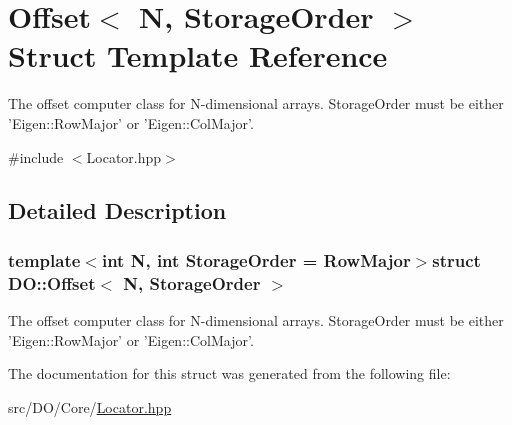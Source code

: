 \hypertarget{struct_d_o_1_1_offset}{\section{Offset$<$ N, Storage\-Order $>$ Struct Template Reference}
\label{struct_d_o_1_1_offset}
}


The offset computer class for N-\/dimensional arrays. Storage\-Order must be either 'Eigen\-::\-Row\-Major' or 'Eigen\-::\-Col\-Major'.  




{\ttfamily \#include $<$Locator.\-hpp$>$}



\subsection{Detailed Description}
\subsubsection*{template$<$int N, int Storage\-Order = Row\-Major$>$struct D\-O\-::\-Offset$<$ N, Storage\-Order $>$}

The offset computer class for N-\/dimensional arrays. Storage\-Order must be either 'Eigen\-::\-Row\-Major' or 'Eigen\-::\-Col\-Major'. 

The documentation for this struct was generated from the following file\-:\begin{DoxyCompactItemize}
\item 
src/\-D\-O/\-Core/\hyperlink{_locator_8hpp}{Locator.\-hpp}\end{DoxyCompactItemize}
